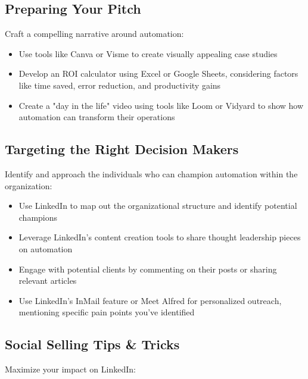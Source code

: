 \subsection{Preparing Your Pitch}

Craft a compelling narrative around automation:

\begin{itemize}
    \item Use tools like Canva or Visme to create visually appealing case studies
    \item Develop an ROI calculator using Excel or Google Sheets, considering factors like time saved, error reduction, and productivity gains
    \item Create a "day in the life" video using tools like Loom or Vidyard to show how automation can transform their operations
\end{itemize}


\subsection{Targeting the Right Decision Makers}

Identify and approach the individuals who can champion automation within the organization:

\begin{itemize}
    \item Use LinkedIn to map out the organizational structure and identify potential champions
    \item Leverage LinkedIn's content creation tools to share thought leadership pieces on automation
    \item Engage with potential clients by commenting on their posts or sharing relevant articles
    \item Use LinkedIn's InMail feature or Meet Alfred for personalized outreach, mentioning specific pain points you've identified
\end{itemize}

\subsection{Social Selling Tips \& Tricks}

Maximize your impact on LinkedIn:

